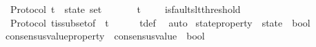 \begin{isabellebody}
\isanewline
{}\isamarkupfalse%
\ {\isacharparenleft}\ Protocol{\isacharparenright}\ {\isasymSigma}t\ {\isacharcolon}{\isacharcolon}\ {\isachardoublequoteopen}state\ set{\isachardoublequoteclose}\isanewline
\ \ \isanewline
\ \ \ \ {\isachardoublequoteopen}{\isasymSigma}t\ {\isacharequal}\ {\isacharbraceleft}{\isasymsigma}\ {\isasymin}\ {\isasymSigma}{\isachardot}\ is{\isacharunderscore}faults{\isacharunderscore}lt{\isacharunderscore}threshold\ {\isasymsigma}{\isacharbraceright}{\isachardoublequoteclose}\ \isanewline
\isanewline
{}\isamarkupfalse%
\ {\isacharparenleft}\ Protocol{\isacharparenright}\ {\isasymSigma}t{\isacharunderscore}is{\isacharunderscore}subset{\isacharunderscore}of{\isacharunderscore}{\isasymSigma}\ {\isacharcolon}\ {\isachardoublequoteopen}{\isasymSigma}t\ {\isasymsubseteq}\ {\isasymSigma}{\isachardoublequoteclose}\isanewline
%
\isadelimproof
\ \ %
\endisadelimproof
%
\isatagproof
{}\isamarkupfalse%
\ {\isasymSigma}t{\isacharunderscore}def\ \isamarkupfalse%
\ auto%
\endisatagproof
{\isafoldproof}%
%
\isadelimproof
\isanewline
%
\endisadelimproof
\isanewline
\isanewline
{}\isamarkupfalse%
\ state{\isacharunderscore}property\ {\isacharequal}\ {\isachardoublequoteopen}state\ {\isasymRightarrow}\ bool{\isachardoublequoteclose}\isanewline
\isanewline
\isanewline
{}\isamarkupfalse%
\ consensus{\isacharunderscore}value{\isacharunderscore}property\ {\isacharequal}\ {\isachardoublequoteopen}consensus{\isacharunderscore}value\ {\isasymRightarrow}\ bool{\isachardoublequoteclose}\isanewline
%
\isadelimtheory
\isanewline
%
\endisadelimtheory
%
\isatagtheory
{}\isamarkupfalse%
%
\endisatagtheory
{\isafoldtheory}%
%
\isadelimtheory
%
\endisadelimtheory
%
\end{isabellebody}%
\endinput
